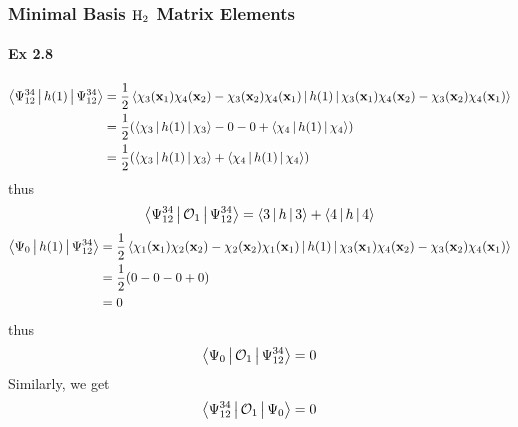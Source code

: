 \documentclass[a4paper]{article}
\newcommand{\ex}[1]{\paragraph{Ex #1}}
\numberwithin{equation}{subsection}
\begin{document}
\subsubsection{Minimal Basis $ \ce{H_2} $ Matrix Elements}
\ex{2.8}\label{2.8}
\begin{equation}\label{key}
\begin{aligned}
\Braket{\Psi_{12}^{34} | h(1) | \Psi_{12}^{34}} &= \dfrac{1}{2}\Braket{\chi_3(\vb{x}_1)\chi_4(\vb{x}_2) - \chi_3(\vb{x}_2)\chi_4(\vb{x}_1) | h(1) | \chi_3(\vb{x}_1)\chi_4(\vb{x}_2) - \chi_3(\vb{x}_2)\chi_4(\vb{x}_1)}\\
&= \dfrac{1}{2}\qty(\Braket{\chi_3|h(1)|\chi_3} - 0 - 0 + \Braket{\chi_4|h(1)|\chi_4})\\
&= \dfrac{1}{2}\qty(\Braket{\chi_3|h(1)|\chi_3} + \Braket{\chi_4|h(1)|\chi_4})
\end{aligned}
\end{equation}
thus
\begin{equation}\label{key}
\Braket{\Psi_{12}^{34} | \mathcal{O}_1 | \Psi_{12}^{34}} = \Braket{3|h|3} + \Braket{4|h|4}
\end{equation}
\begin{equation}\label{key}
\begin{aligned}
\Braket{\Psi_0 | h(1) | \Psi_{12}^{34}} &= \dfrac{1}{2}\Braket{\chi_1(\vb{x}_1)\chi_2(\vb{x}_2) - \chi_2(\vb{x}_2)\chi_1(\vb{x}_1) | h(1) | \chi_3(\vb{x}_1)\chi_4(\vb{x}_2) - \chi_3(\vb{x}_2)\chi_4(\vb{x}_1)}\\
&= \dfrac{1}{2}\qty(0 - 0 - 0 + 0)\\
&= 0
\end{aligned}
\end{equation}
thus
\begin{equation}\label{key}
\Braket{\Psi_0 | \mathcal{O}_1 | \Psi_{12}^{34}} = 0
\end{equation}
Similarly, we get
\begin{equation}\label{key}
\Braket{\Psi_{12}^{34} | \mathcal{O}_1 | \Psi_0} = 0
\end{equation}
\end{document}
